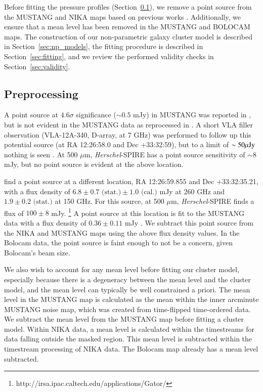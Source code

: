 \documentclass[onecolumn,traditabstract]{aa}
\begin{document}
Before fitting the pressure profiles (Section~\ref{sec:preprocessing}),
we remove a point source from the MUSTANG and NIKA maps based on previous works
\citep{adam2015,romero2017}. Additionally, we ensure that a mean level has been removed in the MUSTANG and BOLOCAM maps. 
The construction of our non-parametric galaxy cluster model is described in Section~\ref{sec:np_models}, the fitting
procedure is described in Section~\ref{sec:fitting}, and we review the performed validity checks in Section~\ref{sec:validity}.

\subsection{Preprocessing}
\label{sec:preprocessing}


A point source at $4.6\sigma$ significance ($\sim 0.5$ mJy) in MUSTANG was reported in \citet{korngut2011}, but is not
evident in the MUSTANG data as reprocessed in \citet{romero2017}. A short VLA filler observation (VLA-12A-340, D-array, at 7 GHz)
was performed to follow up this potential source (at RA 12:26:58.0 and Dec +33:32:59), but to a limit of $\sim 50 {\rm \mu Jy}$ nothing
is seen \citep{romero2017}. At 500 $\mu$m, \emph{Herschel}-SPIRE has a point source sensitivity of $\sim 8$ mJy, but no point
source is evident at the above location.

\citet{adam2015} find a point source at a different location, RA 12:26:59.855 and Dec +33:32:35.21, with a flux density of 
$6.8 \pm 0.7 \text{ (stat.)} \pm 1.0 \text{ (cal.)}$ mJy at 260 GHz and $1.9 \pm 0.2 \text{ (stat.)}$ at 150 GHz.
For this source, at 500 $\mu$m, \emph{Herschel}-SPIRE finds a flux of $100 \pm 8$ mJy.
\footnote{{http://irsa.ipac.caltech.edu/applications/Gator/}} A point source at this location is fit to the MUSTANG
data with a flux density of $0.36 \pm 0.11$ mJy \citep{romero2017}.
We subtract this point source from the NIKA and MUSTANG maps using the above flux density values.
In the Bolocam data, the point source is faint enough to not be a concern, given Bolocam's beam size.

We also wish to account for any mean level before fitting our cluster model, especially because there is a degeneracy
between the mean level and the cluster model, and the mean level can typically be well constrained a priori.
The mean level in the MUSTANG map is calculated
as the mean within the inner arcminute MUSTANG noise map, which was created from time-flipped time-ordered data.
We subtract the mean level from the MUSTANG map before fitting a cluster model.
Within NIKA data, a mean level is calculated within the timestreams for data falling outside
the masked region. This mean level is subtracted within the timestream processing of NIKA data. The Bolocam map already has
a mean level subtracted.
\end{document}
